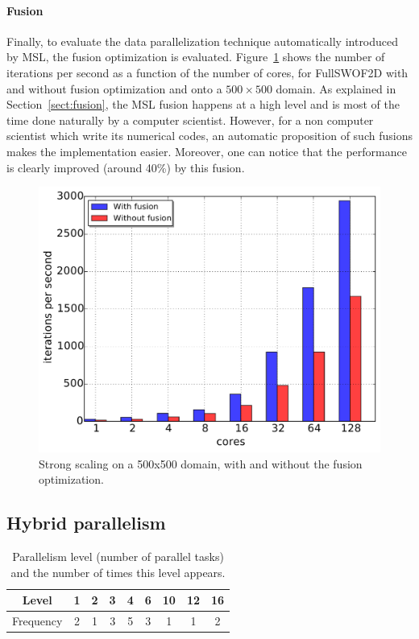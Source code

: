 \paragraph{\textbf{Fusion}} Finally, to evaluate the data parallelization technique automatically introduced by MSL, the fusion optimization is evaluated.
Figure~\ref{fig:fusion} shows the number of iterations per second as a function of the number of cores, for FullSWOF2D with and without fusion optimization and onto a $500 \times 500$ domain. As explained in Section~\ref{sect:fusion}, the MSL fusion happens at a high level and is most of the time done naturally by a computer scientist. However, for a non computer scientist which write its numerical codes, an automatic proposition of such fusions makes the implementation easier. Moreover, one can notice that the performance is clearly improved (around 40\%) by this fusion.

\begin{figure}[!h]\begin{center}
  \includegraphics[width=.6\textwidth]{../results/task_scaling/500_200/fusVSbase.pdf}
  \caption{Strong scaling on a 500x500 domain, with and without the fusion optimization.}
  \label{fig:fusion}
\end{center}\end{figure}

\subsection{Hybrid parallelism}

\begin{table}[th]
 \begin{center}
 \begin{tabular}{|c|c|c|c|c|c|c|c|c|}
    \hline 
   Level & 1 & 2 & 3 & 4 & 6 & 10 & 12 & 16\\
   \hline
   Frequency & 2 & 1 & 3 & 5 & 3 & 1 & 1 & 2\\
   \hline
 \end{tabular}
\caption{Parallelism level (number of parallel tasks) and the number of times this level appears.}
\label{fig:freq}
 \end{center}
\end{table}

